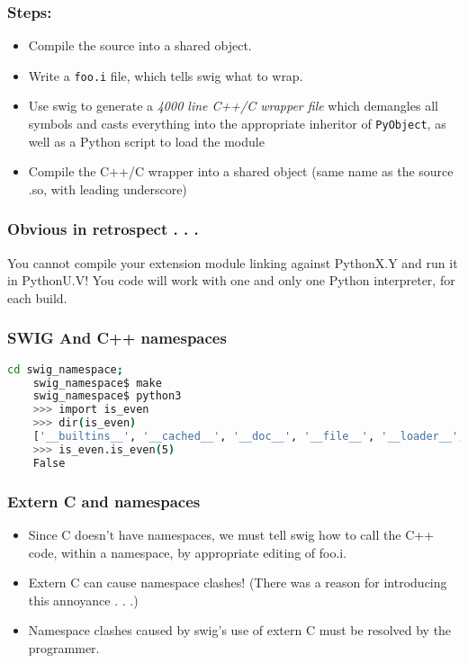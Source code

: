 \documentclass{beamer}
\begin{document}
\begin{frame}[fragile]
  \frametitle{Steps:}
  \begin{itemize}
  \item Compile the source into a shared object.
  \item Write a \texttt{foo.i} file, which tells swig what to wrap.
  \item Use swig to generate a \emph{4000 line C++/C wrapper file} which demangles all symbols and casts everything into the appropriate inheritor of \texttt{PyObject}, as well as a Python script to load the module
  \item Compile the C++/C wrapper into a shared object (same name as the source .so, with leading underscore)
  \end{itemize}
\end{frame}

\begin{frame}[fragile]
  \frametitle{Obvious in retrospect . . .}
  You cannot compile your extension module linking against PythonX.Y and run it in PythonU.V! You code will work with one and only one Python interpreter, for each build.
\end{frame}



\begin{frame}[fragile]
  \frametitle{SWIG And C++ namespaces}
  \begin{lstlisting}[language=bash]
    cd swig_namespace;
    swig_namespace$ make
    swig_namespace$ python3
    >>> import is_even
    >>> dir(is_even)
    ['__builtins__', '__cached__', '__doc__', '__file__', '__loader__', '__name__', '__package__', '__spec__', '_is_even', '_newclass', '_object', '_swig      _getattr', '_swig_getattr_nondynamic', '_swig_property', '_swig_repr', '_swig_setattr', '_swig_setattr_nondynamic', 'is_even']
    >>> is_even.is_even(5)
    False
  \end{lstlisting}
\end{frame}

\begin{frame}
  \frametitle{Extern C and namespaces}
  \begin{itemize}
    \item Since C doesn't have namespaces, we must tell swig how to call the C++ code, within a namespace, by appropriate editing of foo.i.

    \item Extern C can cause namespace clashes! (There was a reason for introducing this annoyance . . .)
    \item Namespace clashes caused by swig's use of extern C must be resolved by the programmer.
  \end{itemize}
\end{frame}
\end{document}
